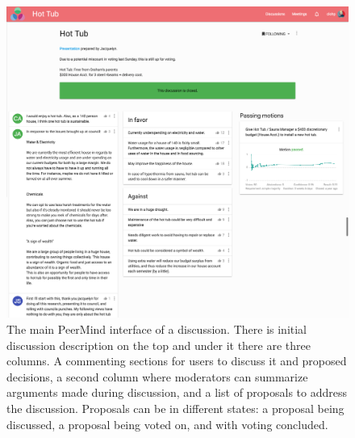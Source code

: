 \documentclass[chi_draft]{sigchi}
\begin{document}
\begin{figure}
  \centering
  \includegraphics[width=1.75\columnwidth]{figures/peermind.png}
  \caption{The main PeerMind interface of a discussion. There is initial discussion description on the top and under it there
  are three columns. A commenting sections for users to discuss it and proposed decisions, a second column where moderators can
  summarize arguments made during discussion, and a list of proposals to address the discussion.
  Proposals can be in different states: a proposal being discussed, a proposal being voted on, and with voting concluded.}\label{fig:peermind}
\end{figure}



%
\end{document}

